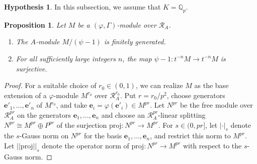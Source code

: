 \documentclass[12pt]{article}
\newtheorem{prop}[theorem]{Proposition}
\theoremstyle{definition}
\newtheorem{hypothesis}[theorem]{Hypothesis}
\numberwithin{equation}{theorem}
\newcommand{\calR}{\mathcal{R}}
\newcommand{\QQ}{\mathbb{Q}}
\newcommand{\bbe}{\mathbf{e}}
\def\Qp{\QQ_p}
\begin{document}
\begin{hypothesis}
In this subsection, we assume that $K = \Qp$.
\end{hypothesis}

\begin{prop} \label{P:psi cokernel}
Let $M$ be a $(\varphi, \Gamma)$-module over $\calR_A$.
\begin{enumerate}
\item[(1)]
The $A$-module $M/(\psi-1)$ is finitely generated.
\item[(2)]
For all sufficiently large integers $n$, the map $\psi-1: t^{-n}M \to t^{-n}M$ is surjective.
\end{enumerate}
\end{prop}
\begin{proof}
For a suitable choice of $r_0 \in (0,1)$, we can realize $M$ as the base extension of a $\varphi$-module $M^{r_0}$
over $\calR^{r_0}_A$. Put $r = r_0/p^2$, choose generators $\bbe'_1, \dots, \bbe'_n$ of $M^{r_0}$, and take
$\bbe_i = \varphi(\bbe'_i) \in M^{pr}$. Let $N^{pr}$ be the free module over $\calR^{pr}_A$ on the generators
$\bbe_1,\dots,\bbe_n$ and choose an $\calR_A^{pr}$-linear splitting $N^{pr} \cong M^{pr} \oplus P^{pr}$ of the surjection $\mathrm{proj}: N^{pr} \to M^{pr}$.
For $s \in (0,pr]$, let $|\cdot|_s$
denote the $s$-Gauss norm on $N^{pr}$ for the basis $\bbe_1,\dots,\bbe_n$, and restrict this norm to $M^{pr}$.
Let $||\mathrm{proj}||_s$ denote the operator norm of $\mathrm{proj}: N^{pr} \to M^{pr}$ with respect to the $s$-Gauss norm.


\end{proof}
\end{document}
